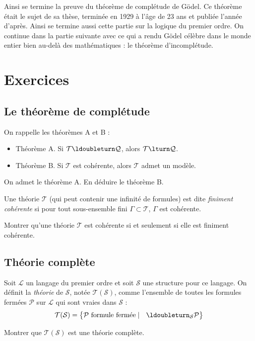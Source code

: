 \documentclass[11pt,class=report,crop=false]{standalone}
\begin{document}
\bigskip 
\bigskip


Ainsi se termine la preuve du théorème de complétude de Gödel.
Ce théorème était le sujet de sa thèse, terminée en 1929 à l'âge de 23 ans et publiée l'année d'après.
Ainsi se termine aussi cette partie sur la logique du premier ordre.
On continue dans la partie suivante avec ce qui a rendu Gödel célèbre dans le monde entier bien au-delà des mathématiques : le théorème d'incomplétude.

\section*{Exercices}

\subsection*{Le théorème de complétude}

\begin{exercicecours}
	On rappelle les théorèmes A et B :
	\begin{itemize}
		\item Théorème A. Si $\mathcal{T} \ldoubleturn \mathcal{Q}$, alors $\mathcal{T} \lturn \mathcal{Q}$.
		
		\item Théorème B. Si $\mathcal{T}$ est cohérente, alors $\mathcal{T}$ admet un modèle.		
	\end{itemize}
	
	On admet le théorème A. En déduire le théorème B.	
\end{exercicecours}


\begin{exercicecours}
	Une théorie $\mathcal{T}$ (qui peut contenir une infinité de formules) est dite \emph{finiment cohérente} si pour tout sous-ensemble fini $\Gamma \subset \mathcal{T}$, $\Gamma$ est cohérente.
	
	Montrer qu'une théorie $\mathcal{T}$ est cohérente si et seulement si elle est finiment cohérente.
\end{exercicecours}



\subsection*{Théorie complète}

\begin{exercicecours}
	Soit $\mathcal{L}$ un langage du premier ordre et soit $\mathcal{S}$ une structure pour ce langage. 
	On définit la \emph{théorie} de $\mathcal{S}$, notée $\mathcal{T}(\mathcal{S})$, comme l'ensemble de toutes les formules fermées $\mathcal{P}$ sur $\mathcal{L}$ qui sont vraies dans $\mathcal{S}$ :
	\[ \mathcal{T}(\mathcal{S}) = \big\{ \mathcal{P} \text{ formule fermée} \mid \ \  \ldoubleturn_{\mathcal{S}} \mathcal{P} \big\} \]

	Montrer que $\mathcal{T}(\mathcal{S})$ est une théorie complète.
\end{exercicecours}
\end{document}
